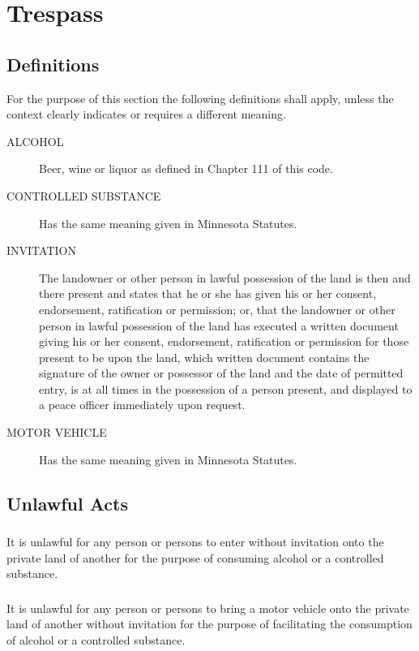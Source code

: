 \section{Trespass}
\subsection{Definitions}
For the purpose of this section the following definitions shall apply, unless the context clearly indicates or requires a different meaning.
\begin{description}
    \item[ALCOHOL] Beer, wine or liquor as defined in Chapter 111 of this code.
    \item[CONTROLLED SUBSTANCE] Has the same meaning given in Minnesota Statutes.
    \item[INVITATION] The landowner or other person in lawful possession of the land is then and there present and states that he or she has given his or her consent, endorsement, ratification or permission; or, that the landowner or other person in lawful possession of the land has executed a written document giving his or her consent, endorsement, ratification or permission for those present to be upon the land, which written document contains the signature of the owner or possessor of the land and the date of permitted entry, is at all times in the possession of a person present, and displayed to a peace officer immediately upon request.
    \item[MOTOR VEHICLE] Has the same meaning given in Minnesota Statutes.
\end{description}
\subsection{Unlawful Acts}
\subsubsection{}
It is unlawful for any person or persons to enter without invitation onto the private land of another for the purpose of consuming alcohol or a controlled substance.
\subsubsection{}
It is unlawful for any person or persons to bring a motor vehicle onto the private land of another without invitation for the purpose of facilitating the consumption of alcohol or a controlled substance.
